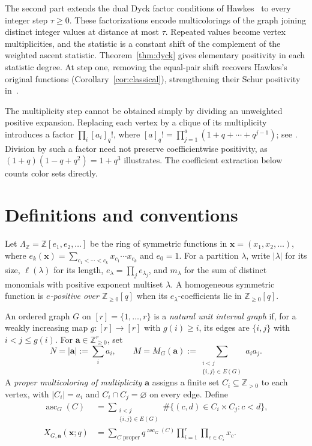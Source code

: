 \documentclass[11pt]{article}
\theoremstyle{remark}
\newcommand{\Z}{\mathbb Z}
\newcommand{\NN}{\mathbb Z_{\geq 0}}
\newcommand{\Npos}{\mathbb Z_{>0}}
\newcommand{\xx}{\mathbf x}
\newcommand{\avec}{\mathbf a}
\DeclareMathOperator{\asc}{asc}
\numberwithin{equation}{section}
\begin{document}
The second part extends the dual Dyck factor conditions of
Hawkes~\cite{Hawkes} to every integer step $\tau\geq0$. These
factorizations encode multicolorings of the graph joining distinct
integer values at distance at most $\tau$. Repeated values become vertex
multiplicities, and the statistic is a constant shift of the complement
of the weighted ascent statistic. Theorem~\ref{thm:dyck} gives elementary
positivity in each statistic degree. At step one, removing the
equal-pair shift recovers Hawkes's original functions
(Corollary~\ref{cor:classical}), strengthening their Schur positivity
in~\cite[Corollary~3.19]{Hawkes}.

The multiplicity step cannot be obtained simply by dividing an unweighted
positive expansion. Replacing each vertex by a clique of its multiplicity
introduces a factor $\prod_i[a_i]_q!$, where
$[a]_q!=\prod_{j=1}^a(1+q+\cdots+q^{j-1})$; see
\cite[Remark~4.4]{KL}. Division by such a factor need not preserve
coefficientwise positivity, as $(1+q)(1-q+q^2)=1+q^3$ illustrates.
The coefficient extraction below counts color sets directly.

\section{Definitions and conventions}\label{sec:definitions}
Let $\Lambda_{\Z}=\Z[e_1,e_2,\ldots]$ be the ring of symmetric functions in
$\xx=(x_1,x_2,\ldots)$, where
$e_k(\xx)=\sum_{c_1<\cdots<c_k}x_{c_1}\cdots x_{c_k}$ and $e_0=1$.
For a partition $\lambda$, write $|\lambda|$ for its size,
$\ell(\lambda)$ for its length, $e_\lambda=\prod_j e_{\lambda_j}$,
and $m_\lambda$ for the sum of distinct monomials with positive exponent
multiset $\lambda$. A homogeneous symmetric function is
\emph{$e$-positive over $\NN[q]$} when its $e_\lambda$-coefficients lie in
$\NN[q]$.

An ordered graph $G$ on $[r]=\{1,\ldots,r\}$ is a \emph{natural unit
interval graph} if, for a weakly increasing map $g:[r]\to[r]$ with
$g(i)\geq i$, its edges are $\{i,j\}$ with $i<j\leq g(i)$.
For $\avec\in\NN^r$, set
\begin{equation}\label{eq:NM}
 N=|\avec|:=\sum_i a_i,
 \qquad M=M_G(\avec):=\sum_{\substack{i<j\\\{i,j\}\in E(G)}}a_i a_j.
\end{equation}
A \emph{proper multicoloring of multiplicity $\avec$} assigns a finite set
$C_i\subseteq\Npos$ to each vertex, with $|C_i|=a_i$ and
$C_i\cap C_j=\varnothing$ on every edge. Define
\begin{equation}\label{eq:weighted-function}
 \begin{aligned}
 \asc_G(C)&=\sum_{\substack{i<j\\\{i,j\}\in E(G)}}
       \#\{(c,d)\in C_i\times C_j:c<d\},\\
 X_{G,\avec}(\xx;q)&=\sum_{C\text{ proper}}q^{\asc_G(C)}
       \prod_{i=1}^r\prod_{c\in C_i}x_c.
 \end{aligned}
\end{equation}
\end{document}
